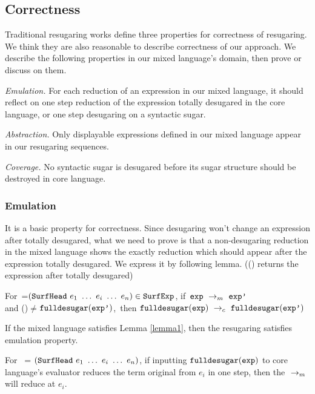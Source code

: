 \subsection{Correctness}
\label{mark:correct}

Traditional resugaring works\cite{resugaring,hygienic} define three properties for correctness of resugaring. We think they are also reasonable to describe correctness of our approach. We describe the following properties in our mixed language's domain, then prove or discuss on them.

\emph{Emulation.} For each reduction of an expression in our mixed language, it should reflect on one step reduction of the expression totally desugared in the core language, or one step desugaring on a syntactic sugar.

\emph{Abstraction.} Only displayable expressions defined in our mixed language appear in our resugaring sequences.

\emph{Coverage.} No syntactic sugar is desugared before its sugar structure should be destroyed in core language.

\subsubsection{Emulation} It is a basic property for correctness. Since desugaring won't change an expression after totally desugared, what we need to prove is that a non-desugaring reduction in the mixed language shows the exactly reduction which should appear after the expression totally desugared. We express it by following lemma. (() returns the expression after  totally desugared)

\begin{lemma}
\label{lemma1}

For~=$(\mbox{\tt SurfHead}~e_1~\ldots~e_i~\ldots~e_n)\in\mbox{\tt SurfExp}$, if~$\mbox{\tt exp} ~\rightarrow_m~\mbox{\tt exp'}$\\ and ()$\not=$$\mbox{\tt fulldesugar}(\mbox{\tt exp'})$,~then $\mbox{\tt fulldesugar}(\mbox{\tt exp}) ~\rightarrow_c~\mbox{\tt fulldesugar}(\mbox{\tt exp'})$

\end{lemma}

\begin{Def}[Emulation]
If the mixed language satisfies Lemma \ref{lemma1}, then the resugaring satisfies emulation property.
\end{Def}

\begin{lemma}
\label{lemma2}

For~ = $(\mbox{\tt SurfHead}~e_1~\ldots~e_i~\ldots~e_n)$, if inputting $\mbox{\tt fulldesugar}(\mbox{\tt exp})$ to core language's evaluator reduces the term original from $e_i$ in one step, then the $~\rightarrow_m~$ will reduce  at $e_i$.

\end{lemma}

